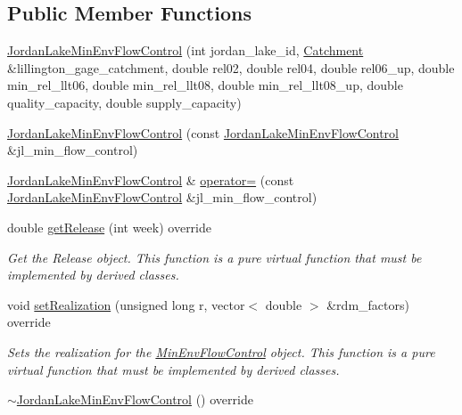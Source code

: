 \subsection*{Public Member Functions}
\begin{DoxyCompactItemize}
\item 
\mbox{\hyperlink{classJordanLakeMinEnvFlowControl_ac8e2b846b66115c2db3bc4ea3ed44297}{Jordan\+Lake\+Min\+Env\+Flow\+Control}} (int jordan\+\_\+lake\+\_\+id, \mbox{\hyperlink{classCatchment}{Catchment}} \&lillington\+\_\+gage\+\_\+catchment, double rel02, double rel04, double rel06\+\_\+up, double min\+\_\+rel\+\_\+llt06, double min\+\_\+rel\+\_\+llt08, double min\+\_\+rel\+\_\+llt08\+\_\+up, double quality\+\_\+capacity, double supply\+\_\+capacity)
\item 
\mbox{\hyperlink{classJordanLakeMinEnvFlowControl_a44dfb259a9b61886b9acfcb3bec96c0f}{Jordan\+Lake\+Min\+Env\+Flow\+Control}} (const \mbox{\hyperlink{classJordanLakeMinEnvFlowControl}{Jordan\+Lake\+Min\+Env\+Flow\+Control}} \&jl\+\_\+min\+\_\+flow\+\_\+control)
\item 
\mbox{\hyperlink{classJordanLakeMinEnvFlowControl}{Jordan\+Lake\+Min\+Env\+Flow\+Control}} \& \mbox{\hyperlink{classJordanLakeMinEnvFlowControl_a1ac6bbacecf928296ff5f86ddbf0d973}{operator=}} (const \mbox{\hyperlink{classJordanLakeMinEnvFlowControl}{Jordan\+Lake\+Min\+Env\+Flow\+Control}} \&jl\+\_\+min\+\_\+flow\+\_\+control)
\item 
double \mbox{\hyperlink{classJordanLakeMinEnvFlowControl_a5c2456c26fa141824c247cd15bf5c57d}{get\+Release}} (int week) override
\begin{DoxyCompactList}\small\item\em Get the Release object. This function is a pure virtual function that must be implemented by derived classes. \end{DoxyCompactList}\item 
void \mbox{\hyperlink{classJordanLakeMinEnvFlowControl_aa1e816121060212f3dbeffda90a7baec}{set\+Realization}} (unsigned long r, vector$<$ double $>$ \&rdm\+\_\+factors) override
\begin{DoxyCompactList}\small\item\em Sets the realization for the {\ttfamily \mbox{\hyperlink{classMinEnvFlowControl}{Min\+Env\+Flow\+Control}}} object. This function is a pure virtual function that must be implemented by derived classes. \end{DoxyCompactList}\item 
\mbox{\hyperlink{classJordanLakeMinEnvFlowControl_a97c9cefc5e56d0bee8075a7c1616143e}{$\sim$\+Jordan\+Lake\+Min\+Env\+Flow\+Control}} () override
\end{DoxyCompactItemize}
